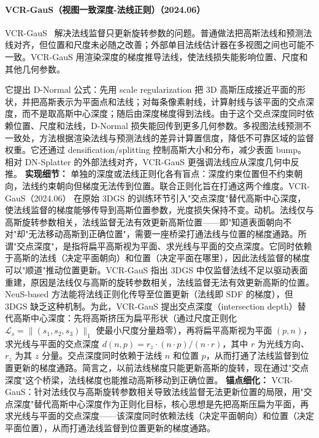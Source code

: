 \paragraph{VCR-GauS（视图一致深度-法线正则）（2024.06）}
VCR-GauS~\cite{2406_05774} 解决法线监督只更新旋转参数的问题。普通做法把高斯法线和预测法线对齐，但位置和尺度未必随之改善；外部单目法线估计器在多视图之间也可能不一致。VCR-GauS 用渲染深度的梯度推导法线，使法线损失能影响位置、尺度和其他几何参数。

它提出 D-Normal 公式：先用 scale regularization 把 3D 高斯压成接近平面的形状，并把高斯表示为平面点和法线；对每条像素射线，计算射线与该平面的交点深度，而不是取高斯中心深度；随后由深度梯度得到法线。由于这个交点深度同时依赖位置、尺度和法线，D-Normal 损失能回传到更多几何参数。多视图法线预测不一致处，方法根据渲染法线与预测法线的差异计算置信度，降低不可靠区域的监督权重。它还通过 densification/splitting 控制高斯大小和分布，减少表面 bump。相对 DN-Splatter 的外部法线对齐，VCR-GauS 更强调法线应从深度几何中反推。
\textbf{实现细节：} 单独的深度或法线正则化各有盲点：深度约束位置但不约束朝向，法线约束朝向但梯度无法传到位置。联合正则化旨在打通这两个维度。VCR-GauS（2024.06） 在原始 3DGS 的训练环节引入"交点深度"替代高斯中心深度，使法线监督的梯度能够传导到高斯位置参数，光度损失保持不变。动机。法线仅与高斯旋转参数相关，法线监督无法有效更新高斯位置——即"知道表面朝向不对"却"无法移动高斯到正确位置"，需要一座桥梁打通法线与位置的梯度通路。所谓"交点深度"，是指将扁平高斯视为平面、求光线与平面的交点深度。它同时依赖于高斯的法线（决定平面朝向）和位置（决定平面在哪里），因此法线监督的梯度可以"顺道"推动位置更新。VCR-GauS 指出 3DGS 中仅监督法线不足以驱动表面重建，原因是法线仅与高斯的旋转参数相关，法线监督无法有效更新高斯的位置。NeuS-based 方法能将法线正则化传导至位置更新（法线即 SDF 的梯度），但 3DGS 缺乏这种机制。为此，VCR-GauS 提出交点深度（intersection depth）替代高斯中心深度：先将高斯挤压为扁平形状（通过尺度正则化 $\mathcal{L}_s = \|(s_1, s_2, s_3)\|_1$ 使最小尺度分量趋零），再将扁平高斯视为平面 $(p, n)$，求光线与平面的交点深度 $d(n, p) = r_z \cdot (n \cdot p) / (n \cdot r)$，其中 $r$ 为光线方向、$r_z$ 为其 $z$ 分量。交点深度同时依赖于法线 $n$ 和位置 $p$，从而打通了法线监督到位置更新的梯度通路。简言之，以前法线梯度只能更新高斯的旋转，现在通过"交点深度"这个桥梁，法线梯度也能推动高斯移动到正确位置。
\textbf{锚点细化：} VCR-GauS：针对法线仅与高斯旋转参数相关导致法线监督无法更新位置的局限，用"交点深度"替代高斯中心深度作为正则化目标，核心思想是先把高斯压扁为平面，再求光线与平面的交点深度——该深度同时依赖法线（决定平面朝向）和位置（决定平面位置），从而打通法线监督到位置更新的梯度通路。
